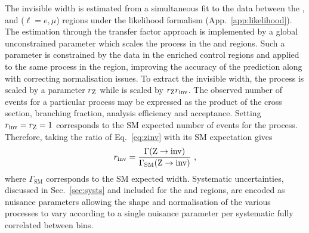 The \PZ invisible width is estimated from a simultaneous fit to the data between the \metplusjets, \diellplusjets and \ellplusjets ($\ell=e,\mu$) regions under the likelihood formalism (App.~\ref{app:likelihood}). The \IWj estimation through the transfer factor approach is implemented by a global unconstrained parameter which scales the \IWj process in the \metplusjets and \ellplusjets regions. Such a parameter is constrained by the data in the \IWj enriched control regions and applied to the same process in the \metplusjets region, improving the accuracy of the prediction along with correcting normalisation issues. To extract the invisible width, the \IZllj process is scaled by a parameter $r_\mathrm{Z}$ while \IZvvj is scaled by $r_\mathrm{Z} r_{{\mathrm{inv}}}$. The observed number of events for a particular process may be expressed as the product of the cross section, branching fraction, analysis efficiency and acceptance.  Setting $r_{\mathrm{inv}}=r_\mathrm{Z}=1$ corresponds to the SM expected number of events for the process. Therefore, taking the ratio of Eq.~\ref{eq:zinv} with its SM expectation gives
%
\begin{equation}
    r_{\mathrm{inv}} = \frac{\Gamma(\mathrm{Z}\rightarrow{\mathrm{inv}})}{\Gamma_{\mathrm{SM}}(\mathrm{Z}\rightarrow{\mathrm{inv}})}\ ,
\end{equation}
%
where $\Gamma_{\mathrm{SM}}$ corresponds to the SM expected width. Systematic uncertainties, discussed in Sec.~\ref{sec:systs} and included for the \metplusjets and \diellplusjets regions, are encoded as nuisance parameters allowing the shape and normalisation of the various processes to vary according to a single nuisance parameter per systematic fully correlated between \recoil bins.

